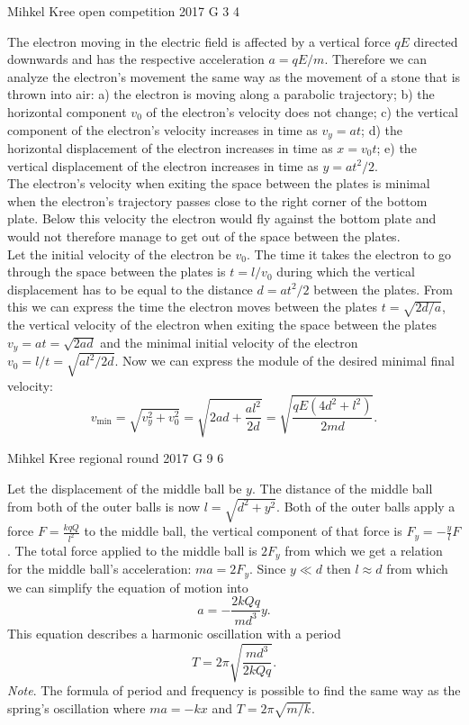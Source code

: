 \documentclass[11pt]{article}
\begin{document}
{Mihkel Kree} %
{open competition} %
{2017} %
{G 3} %
{4} %
{

\ifEngSolution
The electron moving in the electric field is affected by a vertical force $qE$ directed downwards and has the respective acceleration $a=qE/m$. Therefore we can analyze the electron’s movement the same way as the movement of a stone that is thrown into air: a) the electron is moving along a parabolic trajectory; b) the horizontal component $v_0$ of the electron’s velocity does not change; c) the vertical component of the electron’s velocity increases in time as $v_y=at$; d) the horizontal displacement of the electron increases in time as $x=v_0t$; e) the vertical displacement of the electron increases in time as $y=at^2/2$.\\
The electron’s velocity when exiting the space between the plates is minimal when the electron’s trajectory passes close to the right corner of the bottom plate. Below this velocity the electron would fly against the bottom plate and would not therefore manage to get out of the space between the plates.\\
Let the initial velocity of the electron be $v_0$. The time it takes the electron to go through the space between the plates is $t=l/v_0$ during which the vertical displacement has to be equal to the distance $d=at^2/2$ between the plates. From this we can express the time the electron moves between the plates $t=\sqrt{2d/a}$, the vertical velocity of the electron when exiting the space between the plates $v_y=at=\sqrt{2ad}$ and the minimal initial velocity of the electron $v_0=l/t=\sqrt{al^2/2d}$. Now we can express the module of the desired minimal final velocity:
\[
v_\mathrm{min}=\sqrt{v_y^2+v_0^2}=\sqrt{2ad+\frac{al^2}{2d}}=\sqrt{\frac{qE\left(4d^2+l^2\right)}{2md}}.
\]
\fi
}

{Mihkel Kree} %
{regional round} %
{2017} %
{G 9} %
{6} %
{

\ifEngSolution
Let the displacement of the middle ball be $y$. The distance of the middle ball from both of the outer balls is now $l=\sqrt{d^2+y^2}$. Both of the outer balls apply a force $F=\frac{kqQ}{l^2}$ to the middle ball, the vertical component of that force is $F_y=-\frac{y}{l}F$. The total force applied to the middle ball is $2F_y$ from which we get a relation for the middle ball’s acceleration: $ma=2F_y$. Since $y\ll d$ then $l\approx d$ from which we can simplify the equation of motion into
\[
a=-\frac{2kQq}{md^3}y.
\] 
This equation describes a harmonic oscillation with a period
\[ T = 2\pi \sqrt{\frac{md^3}{2kQq}}.\] 
\emph{Note}. The formula of period and frequency is possible to find the same way as the spring’s oscillation where $ma = -kx$ and $T=2\pi \sqrt{m/k}$.
\fi
}
\end{document}
